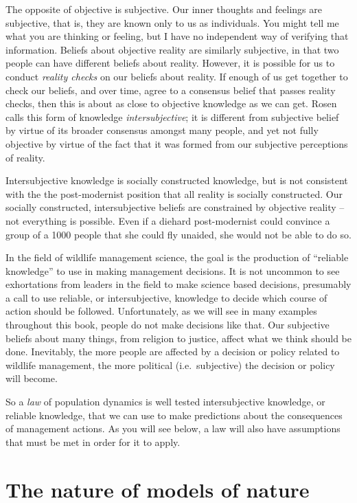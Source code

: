 \documentclass[]{book}
\begin{document}
The opposite of objective is subjective. Our inner thoughts and feelings
are subjective, that is, they are known only to us as individuals. You
might tell me what you are thinking or feeling, but I have no
independent way of verifying that information. Beliefs about objective
reality are similarly subjective, in that two people can have different
beliefs about reality. However, it is possible for us to conduct
\emph{reality checks} on our beliefs about reality. If enough of us get
together to check our beliefs, and over time, agree to a consensus
belief that passes reality checks, then this is about as close to
objective knowledge as we can get. Rosen calls this form of knowledge
\emph{intersubjective}; it is different from subjective belief by virtue
of its broader consensus amongst many people, and yet not fully
objective by virtue of the fact that it was formed from our subjective
perceptions of reality.

Intersubjective knowledge is socially constructed knowledge, but is not
consistent with the the post-modernist position that all reality is
socially constructed. Our socially constructed, intersubjective beliefs
are constrained by objective reality -- not everything is possible. Even
if a diehard post-modernist could convince a group of a 1000 people that
she could fly unaided, she would not be able to do so.

In the field of wildlife management science, the goal is the production
of ``reliable knowledge'' \citep{romesburg1981wildlife} to use in making
management decisions. It is not uncommon to see exhortations from
leaders in the field to make science based decisions, presumably a call
to use reliable, or intersubjective, knowledge to decide which course of
action should be followed. Unfortunately, as we will see in many
examples throughout this book, people do not make decisions like that.
Our subjective beliefs about many things, from religion to justice,
affect what we think should be done. Inevitably, the more people are
affected by a decision or policy related to wildlife management, the
more political (i.e.~subjective) the decision or policy will become.

So a \emph{law} of population dynamics is well tested intersubjective
knowledge, or reliable knowledge, that we can use to make predictions
about the consequences of management actions. As you will see below, a
law will also have assumptions that must be met in order for it to
apply.

\section{The nature of models of
nature}\label{the-nature-of-models-of-nature}
\end{document}
